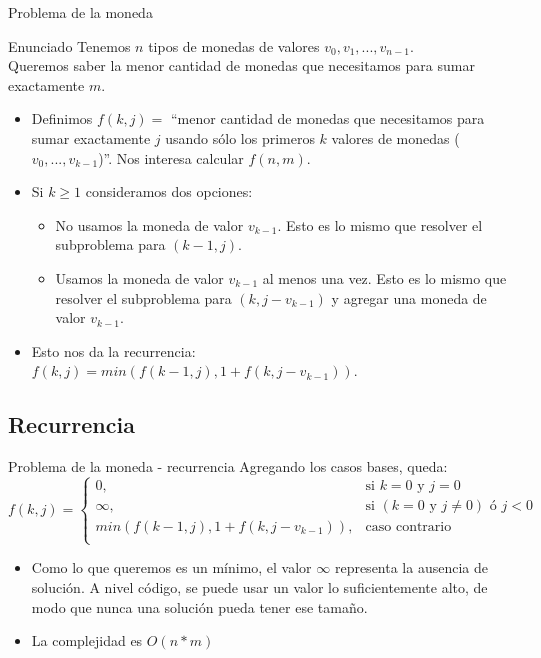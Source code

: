 \documentclass{beamer}
\begin{document}
\begin{frame}{Problema de la moneda}
\begin{block}{Enunciado}
Tenemos $n$ tipos de monedas de valores $v_0,v_1,...,v_{n-1}$. \\
Queremos saber la menor cantidad de monedas que necesitamos para sumar exactamente $m$.
\end{block}
\begin{itemize}
\item
Definimos $f(k,j) = $ ``menor cantidad de monedas que necesitamos para sumar exactamente $j$ usando s\'olo los primeros $k$ valores de monedas ($v_0,...,v_{k-1}$)''. Nos interesa calcular $f(n,m)$.
\item
Si $k \ge 1$ consideramos dos opciones:
\begin{itemize}
\item
No usamos la moneda de valor $v_{k-1}$. Esto es lo mismo que resolver el subproblema para $(k-1,j)$.
\item
Usamos la moneda de valor $v_{k-1}$ al menos una vez. Esto es lo mismo que resolver el subproblema para $(k,j-v_{k-1})$ y agregar una moneda de valor $v_{k-1}$.
\end{itemize}
\item
Esto nos da la recurrencia: $f(k,j) = min(f(k-1,j), 1+f(k,j-v_{k-1}))$.
\end{itemize}
\end{frame}

\subsection{Recurrencia}

\begin{frame}{Problema de la moneda - recurrencia}
Agregando los casos bases, queda:
\[
    f(k,j)=
\begin{cases}
    0,& \text{si } k=0 \text{ y } j=0\\
    \infty,& \text{si } (k=0 \text{ y } j \neq 0) \text{ \'o } j < 0\\
    min(f(k-1,j), 1+f(k,j-v_{k-1})), & \text{caso contrario}\\
\end{cases}
\]
\begin{itemize}
\item
Como lo que queremos es un m\'inimo, el valor $\infty$ representa la ausencia de soluci\'on. A nivel c\'odigo, se puede usar un valor lo suficientemente alto, de modo que nunca una soluci\'on pueda tener ese tama\~no.
\item
La complejidad es $O(n*m)$
\end{itemize}
\end{frame}
\end{document}
